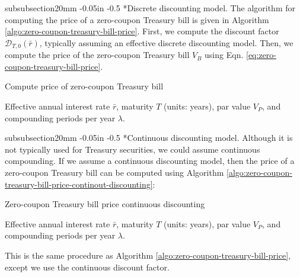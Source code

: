 \documentclass[11pt]{article}
\makeatletter
\theoremstyle{definition}
\renewcommand\subsubsection{\@startsection
	{subsubsection}{2}{0mm}
	{-0.05in}
	{-0.5\baselineskip}
	{\normalfont\normalsize\itshape\bfseries}}
\makeatother
\begin{document}
\subsubsection*{Discrete discounting model.}
The algorithm for computing the price of a zero-coupon Treasury bill is given in Algorithm \ref{algo:zero-coupon-treasury-bill-price}.
First, we compute the discount factor $\mathcal{D}_{T,0}(\bar{r})$, typically assuming an effective discrete discounting model.
Then, we compute the price of the zero-coupon Treasury bill $V_{B}$ using Eqn. \eqref{eq:zero-coupon-treasury-bill-price}.
\begin{algorithm}[h]
    \caption{Compute price of zero-coupon Treasury bill}\label{algo:zero-coupon-treasury-bill-price}
    \begin{algorithmic}[1]
		\Require Effective annual interest rate $\bar{r}$, maturity $T$ (units: years), par value $V_{P}$, and compounding periods per year $\lambda$.

		\Statex
	\end{algorithmic}
\end{algorithm}

\subsubsection*{Continuous discounting model.}
Although it is not typically used for Treasury securities, we could assume continuous compounding. 
If we assume a continuous discounting model, then the price of a zero-coupon Treasury bill can be computed using Algorithm \ref{algo:zero-coupon-treasury-bill-price-continout-discounting}:
\begin{algorithm}[h]
    \caption{Zero-coupon Treasury bill price continuous discounting}\label{algo:zero-coupon-treasury-bill-price-continout-discounting}
    \begin{algorithmic}[1]
		\Require Effective annual interest rate $\bar{r}$, maturity $T$ (units: years), par value $V_{P}$, and compounding periods per year $\lambda$.

		\Statex
	\end{algorithmic}
\end{algorithm}
This is the same procedure as Algorithm \ref{algo:zero-coupon-treasury-bill-price}, except we use the continuous discount factor.
\end{document}
